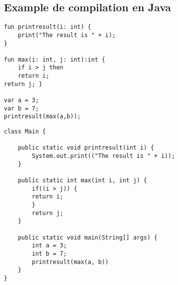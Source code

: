 \documentclass[fleqn]{article}
\begin{document}
    \subsection*{Example de compilation en Java}
    \begin{lstlisting}
fun printresult(i: int) {
    print("The result is " + i);
}

fun max(i: int, j: int):int {
    if i > j then
    return i;
return j; }

var a = 3;
var b = 7;
printresult(max(a,b));        
    \end{lstlisting}
                
    \begin{lstlisting}
class Main {

    public static void printresult(int i) {
        System.out.print(("The result is " + i));
    }
    
    public static int max(int i, int j) {
        if((i > j)) {
        return i;
        }
        return j;
    }
    
    public static void main(String[] args) {
        int a = 3;
        int b = 7;
        printresult(max(a, b))
    }
}
    \end{lstlisting}
\end{document}
